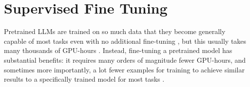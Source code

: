 % 
% 
% 





\section{Supervised Fine Tuning}\label{sec:sft}
Pretrained \glspl{LLM} are trained on so much data that they become generally capable of most tasks even with no additional fine-tuning \cite{brown_language_2020}, but this usually takes many thousands of GPU-hours \cite{touvron_llama_2023, scao_what_2022}.
Instead, fine-tuning a pretrained model has substantial benefits: it requires many orders of magnitude fewer GPU-hours, and sometimes more importantly, a lot fewer examples for training to achieve similar results to a specifically trained model for most tasks \cite{gaddipati_comparative_2020}.

